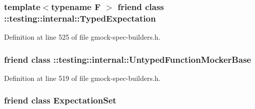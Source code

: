 \subsubsection[{\texorpdfstring{\+::testing\+::internal\+::\+Typed\+Expectation}{::testing::internal::TypedExpectation}}]{\setlength{\rightskip}{0pt plus 5cm}template$<$typename F $>$ friend class \+::{\bf testing\+::internal\+::\+Typed\+Expectation}\hspace{0.3cm}{\ttfamily [friend]}}\hypertarget{classtesting_1_1_expectation_a86c4872d3edbede5e8ac148525bc8893}{}\label{classtesting_1_1_expectation_a86c4872d3edbede5e8ac148525bc8893}


Definition at line 525 of file gmock-\/spec-\/builders.\+h.

\subsubsection[{\texorpdfstring{\+::testing\+::internal\+::\+Untyped\+Function\+Mocker\+Base}{::testing::internal::UntypedFunctionMockerBase}}]{\setlength{\rightskip}{0pt plus 5cm}friend class \+::{\bf testing\+::internal\+::\+Untyped\+Function\+Mocker\+Base}\hspace{0.3cm}{\ttfamily [friend]}}\hypertarget{classtesting_1_1_expectation_a709c2d6bee1223cfbcadc58e884cdb4b}{}\label{classtesting_1_1_expectation_a709c2d6bee1223cfbcadc58e884cdb4b}


Definition at line 519 of file gmock-\/spec-\/builders.\+h.

\subsubsection[{\texorpdfstring{Expectation\+Set}{ExpectationSet}}]{\setlength{\rightskip}{0pt plus 5cm}friend class {\bf Expectation\+Set}\hspace{0.3cm}{\ttfamily [friend]}}\hypertarget{classtesting_1_1_expectation_acf5c2877a449d4ad1889ee5833ebb193}{}\label{classtesting_1_1_expectation_acf5c2877a449d4ad1889ee5833ebb193}



